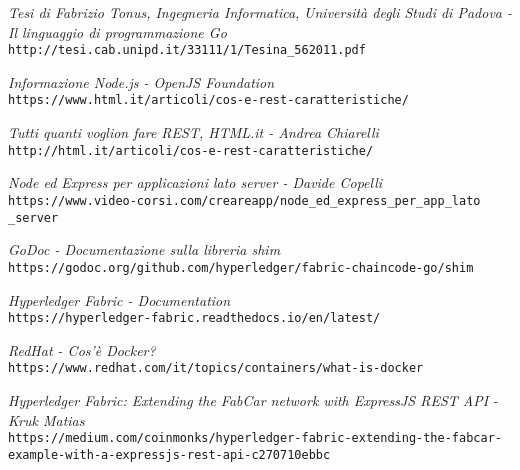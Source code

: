 \begin{thebibliography}{9}
\textit{Tesi di Fabrizio Tonus, Ingegneria Informatica,\newline}
\textit{Università degli Studi di Padova - Il linguaggio di programmazione Go}
\\\texttt{http://tesi.cab.unipd.it/33111/1/Tesina\_562011.pdf}

\textit{Informazione Node.js - OpenJS Foundation}
\\\texttt{https://www.html.it/articoli/cos-e-rest-caratteristiche/}

\textit{Tutti quanti voglion fare REST, HTML.it - Andrea Chiarelli}
\\\texttt{http://html.it/articoli/cos-e-rest-caratteristiche/}

\textit{Node ed Express per applicazioni lato server - Davide Copelli}
\\\texttt{https://www.video-corsi.com/creareapp/node\_ed\_express\_per\_app\_lato}
\\\texttt{\_server}

\textit{GoDoc - Documentazione sulla libreria shim}
\\\texttt{https://godoc.org/github.com/hyperledger/fabric-chaincode-go/shim}

\textit{Hyperledger Fabric - Documentation}
\\\texttt{https://hyperledger-fabric.readthedocs.io/en/latest/}

\textit{RedHat - Cos'è Docker?}
\\\texttt{https://www.redhat.com/it/topics/containers/what-is-docker}

\textit{Hyperledger Fabric: Extending the FabCar network with ExpressJS REST API}
\textit{ - Kruk Matias}
\\\texttt{https://medium.com/coinmonks/hyperledger-fabric\newline-extending-the-fabcar-example-with-a-expressjs-rest-api-c270710ebbc}
\end{thebibliography}